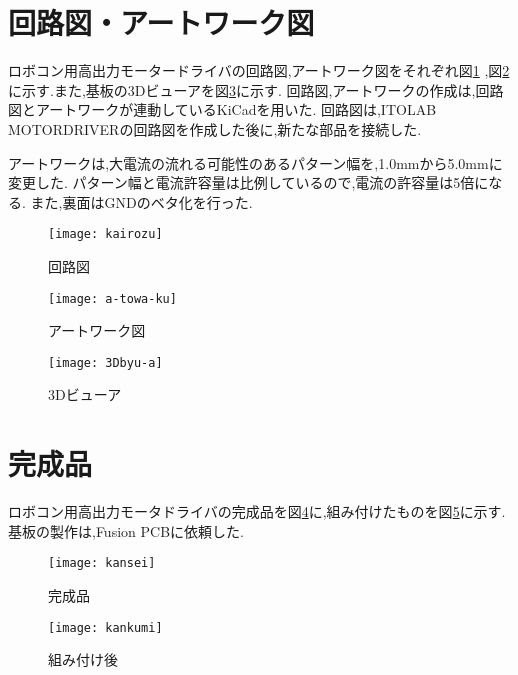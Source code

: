 \section{回路図・アートワーク図}
ロボコン用高出力モータードライバの回路図,アートワーク図をそれぞれ図\ref{fig:kairozu}
,図\ref{fig:a-towa-ku}に示す.また,基板の3Dビューアを図\ref{fig:3Dbyu-a}に示す.
回路図,アートワークの作成は,回路図とアートワークが連動しているKiCadを用いた.
回路図は,ITOLAB MOTORDRIVERの回路図を作成した後に,新たな部品を接続した.

アートワークは,大電流の流れる可能性のあるパターン幅を,1.0mmから5.0mmに変更した.
パターン幅と電流許容量は比例しているので,電流の許容量は5倍になる.
また,裏面はGNDのベタ化を行った.
\begin{figure}[H]
\begin{center}
\texttt{[image: kairozu]}
\end{center}
\caption{回路図}
\label{fig:kairozu}
\end{figure}
\begin{figure}[H]
\begin{center}
\texttt{[image: a-towa-ku]}
\end{center}
\caption{アートワーク図}
\label{fig:a-towa-ku}
\end{figure}
\begin{figure}[H]
\begin{center}
\texttt{[image: 3Dbyu-a]}
\end{center}
\caption{3Dビューア}
\label{fig:3Dbyu-a}
\end{figure}

\section{完成品}
ロボコン用高出力モータドライバの完成品を図\ref{fig:kansei}に,組み付けたものを図\ref{fig:kankumi}に示す.
基板の製作は,Fusion PCBに依頼した.
\begin{figure}[H]
\begin{center}
\texttt{[image: kansei]}
\end{center}
\caption{完成品}
\label{fig:kansei}
\end{figure}
\begin{figure}[H]
\begin{center}
\texttt{[image: kankumi]}
\end{center}
\caption{組み付け後}
\label{fig:kankumi}
\end{figure}

